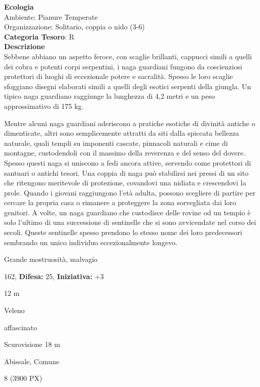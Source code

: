 \begin{multicols}{2}
{\textbf{Ecologia}\\
Ambiente: Pianure Temperate\\
Organizzazione: Solitario, coppia o nido (3-6)\\
\textbf{Categoria Tesoro}: R\\
\textbf{Descrizione}\\
Sebbene abbiano un aspetto feroce, con scaglie brillanti, cappucci simili a quelli dei cobra e potenti corpi serpentini, i naga guardiani fungono da coscienziosi protettori di luoghi di eccezionale potere e sacralità. Spesso le loro scaglie sfoggiano disegni elaborati simili a quelli degli esotici serpenti della giungla. Un tipico naga guardiano raggiunge la lunghezza di 4,2 metri e un peso approssimativo di 175 kg.

Mentre alcuni naga guardiani aderiscono a pratiche esotiche di divinità antiche o dimenticate, altri sono semplicemente attratti da siti dalla spiccata bellezza naturale, quali templi su imponenti cascate, pinnacoli naturali e cime di montagne, custodendoli con il massimo della reverenza e del senso del dovere. Spesso questi naga si uniscono a fedi ancora attive, servendo come protettori di santuari o antichi tesori. Una coppia di naga può stabilirsi nei pressi di un sito che ritengono meritevole di protezione, covandovi una nidiata e crescendovi la prole. Quando i giovani raggiungono l'età adulta, possono scegliere di partire per cercare la propria casa o rimanere a proteggere la zona sorvegliata dai loro genitori. A volte, un naga guardiano che custodisce delle rovine od un tempio è solo l'ultimo di una successione di sentinelle che si sono avvicendate nel corso dei secoli. Queste sentinelle spesso prendono lo stesso nome dei loro predecessori sembrando un unico individuo eccezionalmente longevo.

\noindent
\begin{description}[noitemsep, topsep=0pt, parsep=0pt, partopsep=0pt, leftmargin=0cm, labelwidth=2.2cm]
	\item[\textbf{Taglia/Tipo:}] Grande mostruosità, malvagio
	\item[\textbf{Caratt.:}] 
	\item[\textbf{Punti Ferita:}] 162,  \textbf{Difesa:} 25,  \textbf{Iniziativa:} +3
	\item[\textbf{Movimento:}] 12 m
	\item[\textbf{Tiri Salvez.:}] 
	\item[\textbf{Imm. Danni:}] Veleno
	\item[\textbf{Immunità:}] affascinato
	\item[\textbf{Sensi:}] Scurovisione 18 m
	\item[\textbf{Linguaggi:}] Abissale, Comune
	\item[\textbf{Sfida:}] 8 (3900 PX)\smallskip
\end{description}

}
\end{multicols}

